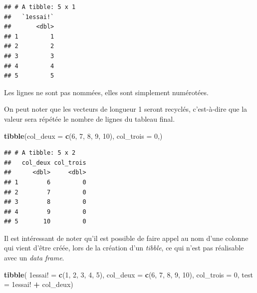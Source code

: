 \documentclass[
  11pt,
]{book}
\newenvironment{Shaded}{\begin{snugshade}}{\end{snugshade}}
\newcommand{\DataTypeTok}[1]{\textcolor[rgb]{0.13,0.29,0.53}{#1}}
\newcommand{\DecValTok}[1]{\textcolor[rgb]{0.00,0.00,0.81}{#1}}
\newcommand{\KeywordTok}[1]{\textcolor[rgb]{0.13,0.29,0.53}{\textbf{#1}}}
\newcommand{\NormalTok}[1]{#1}
\newcommand{\OperatorTok}[1]{\textcolor[rgb]{0.81,0.36,0.00}{\textbf{#1}}}
\newcommand{\StringTok}[1]{\textcolor[rgb]{0.31,0.60,0.02}{#1}}
\numberwithin{equation}{section}
\numberwithin{countremarque}{section}
\begin{document}
\begin{lstlisting}
## # A tibble: 5 x 1
##   `1essai!`
##       <dbl>
## 1         1
## 2         2
## 3         3
## 4         4
## 5         5
\end{lstlisting}

Les lignes ne sont pas nommées, elles sont simplement numérotées.

On peut noter que les vecteurs de longueur 1 seront recyclés, c'est-à-dire que la valeur sera répétée le nombre de lignes du tableau final.

\begin{Shaded}
\begin{Highlighting}[]
\KeywordTok{tibble}\NormalTok{(}\DataTypeTok{col\_deux =} \KeywordTok{c}\NormalTok{(}\DecValTok{6}\NormalTok{, }\DecValTok{7}\NormalTok{, }\DecValTok{8}\NormalTok{, }\DecValTok{9}\NormalTok{, }\DecValTok{10}\NormalTok{),}
       \DataTypeTok{col\_trois =} \DecValTok{0}\NormalTok{,)}
\end{Highlighting}
\end{Shaded}

\begin{lstlisting}
## # A tibble: 5 x 2
##   col_deux col_trois
##      <dbl>     <dbl>
## 1        6         0
## 2        7         0
## 3        8         0
## 4        9         0
## 5       10         0
\end{lstlisting}

Il est intéressant de noter qu'il est possible de faire appel au nom d'une colonne qui vient d'être créée, lors de la création d'un \emph{tibble}, ce qui n'est pas réalisable avec un \emph{data frame}.

\begin{Shaded}
\begin{Highlighting}[]
\KeywordTok{tibble}\NormalTok{(}
  \StringTok{\textasciigrave{}}\DataTypeTok{1essai!}\StringTok{\textasciigrave{}}\NormalTok{ =}\StringTok{ }\KeywordTok{c}\NormalTok{(}\DecValTok{1}\NormalTok{, }\DecValTok{2}\NormalTok{, }\DecValTok{3}\NormalTok{, }\DecValTok{4}\NormalTok{, }\DecValTok{5}\NormalTok{),}
  \DataTypeTok{col\_deux =} \KeywordTok{c}\NormalTok{(}\DecValTok{6}\NormalTok{, }\DecValTok{7}\NormalTok{, }\DecValTok{8}\NormalTok{, }\DecValTok{9}\NormalTok{, }\DecValTok{10}\NormalTok{),}
  \DataTypeTok{col\_trois =} \DecValTok{0}\NormalTok{,}
  \DataTypeTok{test =} \StringTok{\textasciigrave{}}\DataTypeTok{1essai!}\StringTok{\textasciigrave{}} \OperatorTok{+}\StringTok{ }\NormalTok{col\_deux)}
\end{Highlighting}
\end{Shaded}
\end{document}
